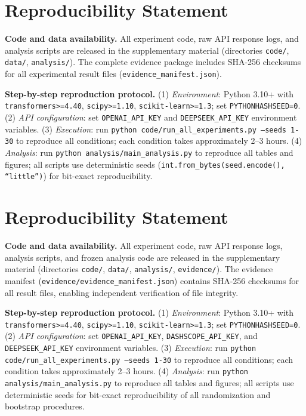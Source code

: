 \documentclass[11pt]{article}
\begin{document}
\section*{Reproducibility Statement}

\textbf{Code and data availability.} All experiment code, raw API response logs, and analysis scripts are released in the supplementary material (directories \texttt{code/}, \texttt{data/}, \texttt{analysis/}). The complete evidence package includes SHA-256 checksums for all experimental result files (\texttt{evidence\_manifest.json}).

\textbf{Step-by-step reproduction protocol.} (1) \textit{Environment}: Python 3.10+ with \texttt{transformers>=4.40}, \texttt{scipy>=1.10}, \texttt{scikit-learn>=1.3}; set \texttt{PYTHONHASHSEED=0}. (2) \textit{API configuration}: set \texttt{OPENAI\_API\_KEY} and \texttt{DEEPSEEK\_API\_KEY} environment variables. (3) \textit{Execution}: run \texttt{python code/run\_all\_experiments.py --seeds 1-30} to reproduce all conditions; each condition takes approximately 2--3 hours. (4) \textit{Analysis}: run \texttt{python analysis/main\_analysis.py} to reproduce all tables and figures; all scripts use deterministic seeds (\texttt{int.from\_bytes(seed.encode(), ``little'')}) for bit-exact reproducibility.


\section*{Reproducibility Statement}
\label{sec:reproducibility}

\textbf{Code and data availability.} All experiment code, raw API response logs, analysis scripts, and frozen analysis code are released in the supplementary material (directories \texttt{code/}, \texttt{data/}, \texttt{analysis/}, \texttt{evidence/}). The evidence manifest (\texttt{evidence/evidence\_manifest.json}) contains SHA-256 checksums for all result files, enabling independent verification of file integrity.

\textbf{Step-by-step reproduction protocol.} (1) \textit{Environment}: Python 3.10+ with \texttt{transformers>=4.40}, \texttt{scipy>=1.10}, \texttt{scikit-learn>=1.3}; set \texttt{PYTHONHASHSEED=0}. (2) \textit{API configuration}: set \texttt{OPENAI\_API\_KEY}, \texttt{DASHSCOPE\_API\_KEY}, and \texttt{DEEPSEEK\_API\_KEY} environment variables. (3) \textit{Execution}: run \texttt{python code/run\_all\_experiments.py --seeds 1-30} to reproduce all conditions; each condition takes approximately 2--3 hours. (4) \textit{Analysis}: run \texttt{python analysis/main\_analysis.py} to reproduce all tables and figures; all scripts use deterministic seeds for bit-exact reproducibility of all randomization and bootstrap procedures.
\end{document}
